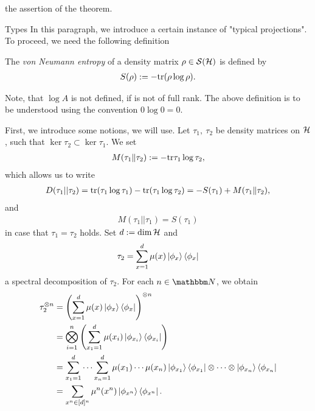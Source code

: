 the assertion of the theorem. 
\begin{subsection}{Types}
In this paragraph, we introduce a certain instance of "typical projections". 	
To proceed, we need the following definition
\begin{definition} \label{def:von_neumann_entropy}
 The \emph{von Neumann entropy} of a density matrix $\rho \in {\mathcal S}({\mathcal H})$ is defined by
 \begin{align*}
  S(\rho) := - \mathrm{tr}(\rho \log \rho).
 \end{align*}
\end{definition}
\begin{remark}
Note, that $\log A$ is not defined, if is not of full rank. The above definition is to be understood using the convention $0 \log 0 = 0$.
\end{remark}
First, we introduce some notions, we will use. Let $\tau_1, \ \tau_2$ be density matrices on ${\mathcal H}$, such that $\ker \tau_2 \subset \ker \tau_1$. We set
\begin{align*}
 M(\tau_1\| \tau_2) := - \mathrm{tr} \tau_1 \log \tau_2,
\end{align*}
which allows us to write
\begin{align*}
 D(\tau_1||\tau_2) 
 = \mathrm{tr}(\tau_1 \log \tau_1) - \mathrm{tr}(\tau_1 \log \tau_2)
 = -S(\tau_1) + M(\tau_1\|\tau_2), 
\end{align*}
and
\begin{align*}
 M(\tau_1||\tau_1) = S(\tau_1)
\end{align*}
in case that $\tau_1 = \tau_2$ holds. Set $d := \dim {\mathcal H}$ and
\begin{align*}
 \tau_2 = \sum_{x=1}^d \mu(x) \ket{\phi_x}\bra{\phi_x}
\end{align*}
a spectral decomposition of $\tau_2$. For each $n \in \bbmN$, we obtain
\begin{align}
 \tau_2^{\otimes n} 
 & = \left(\sum_{x =1}^d \mu(x) \ket{\phi_x} \bra{\phi_x} \right)^{\otimes n} \nonumber 
 \nonumber \\
 & = \bigotimes_{i=1}^n \left(\sum_{x_1 =1}^d \mu(x_i) \ket{\phi_{x_i}} \bra{\phi_{x_i}}  \right) \nonumber  \nonumber \\ 
 & = \sum_{x_1=1}^d \cdots \sum_{x_n = 1}^d \mu(x_1) \cdots \mu(x_n) \ket{\phi_{x_1}} \bra{\phi_{x_1}} \otimes \cdots \otimes \ket{\phi_{x_n}} \bra{\phi_{x_n}} \nonumber \\
 & = \sum_{x^n \in [d]^n} \mu^n(x^n) \ket{\phi_{x^n}}\bra{\phi_{x^n}}.  \label{tens_prod_spect_dec}
\end{align}

\end{subsection}
